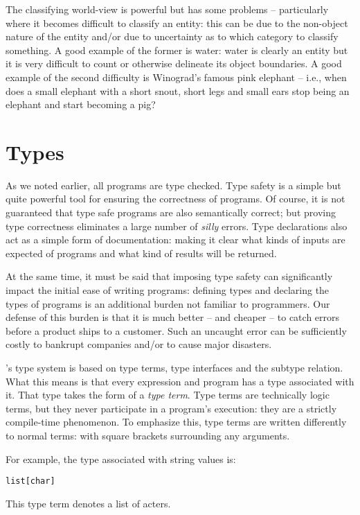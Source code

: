 The classifying world-view is powerful but has some problems -- particularly where it becomes difficult to classify an entity: this can be due to the non-object nature of the entity and/or due to uncertainty as to which category to classify something. A good example of the former is water: water is clearly an entity but it is very difficult to count or otherwise delineate its object boundaries. A good example of the second difficulty is Winograd's famous pink elephant  -- i.e., when does a small elephant with a short snout, short legs and small ears stop being an elephant and start becoming a pig?

\section{Types}
As we noted earlier, all \go programs are type checked. Type safety is a simple but quite powerful tool for ensuring the correctness of programs. Of course, it is not guaranteed that type safe programs are also semantically correct; but proving type correctness eliminates a large number of \emph{silly} errors. Type declarations also act as a simple form of documentation: making it clear what kinds of inputs are expected of programs and what kind of results will be returned.

At the same time, it must be said that imposing type safety can significantly impact the initial ease of writing programs: defining types and declaring the types of programs is an additional burden not familiar to \prolog programmers. Our defense of this burden is that it is much better -- and cheaper -- to catch errors before a product ships to a customer. Such an uncaught error can be sufficiently costly to bankrupt companies and/or to cause major disasters.

\go's type system is based on type terms, type interfaces and the subtype relation. What this means is that every expression and program has a type associated with it. That type takes the form of a \emph{type term}. Type terms are technically logic terms, but they never participate in a program's execution: they are a strictly compile-time phenomenon. To emphasize this, type terms are written differently to normal terms: with square brackets surrounding any arguments.

For example, the type associated with string values is:
\begin{alltt}
list[char]
\end{alltt}
This type term denotes a list of acters.

